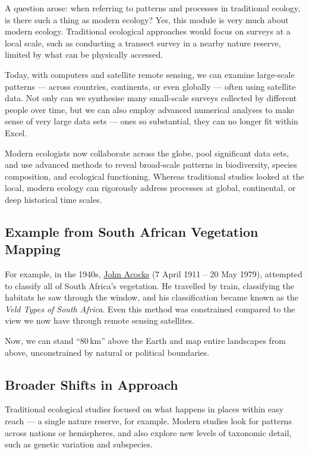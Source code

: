 \documentclass[
  12pt,
]{book}
\begin{document}
A question arose: when referring to patterns and processes in
traditional ecology, is there such a thing as modern ecology? Yes, this
module is very much about modern ecology. Traditional ecological
approaches would focus on surveys at a local scale, such as conducting a
transect survey in a nearby nature reserve, limited by what can be
physically accessed.

Today, with computers and satellite remote sensing, we can examine
large-scale patterns --- across countries, continents, or even globally
--- often using satellite data. Not only can we synthesise many
small-scale surveys collected by different people over time, but we can
also employ advanced numerical analyses to make sense of very large data
sets --- ones so substantial, they can no longer fit within Excel.

Modern ecologists now collaborate across the globe, pool significant
data sets, and use advanced methods to reveal broad-scale patterns in
biodiversity, species composition, and ecological functioning. Whereas
traditional studies looked at the local, modern ecology can rigorously
address processes at global, continental, or deep historical time
scales.

\subsection{Example from South African Vegetation
Mapping}\label{example-from-south-african-vegetation-mapping}

For example, in the 1940s,
\href{https://en.wikipedia.org/wiki/John_Phillip_Harison_Acocks}{John
Acocks} (7 April 1911 -- 20 May 1979), attempted to classify all of
South Africa's vegetation. He travelled by train, classifying the
habitats he saw through the window, and his classification became known
as the \emph{Veld Types of South Africa}. Even this method was
constrained compared to the view we now have through remote sensing
satellites.

Now, we can stand ``\(80\,\mathrm{km}\)'' above the Earth and map entire
landscapes from above, unconstrained by natural or political boundaries.

\subsection{Broader Shifts in
Approach}\label{broader-shifts-in-approach}

Traditional ecological studies focused on what happens in places within
easy reach --- a single nature reserve, for example. Modern studies look
for patterns across nations or hemispheres, and also explore new levels
of taxonomic detail, such as genetic variation and subspecies.
\end{document}

